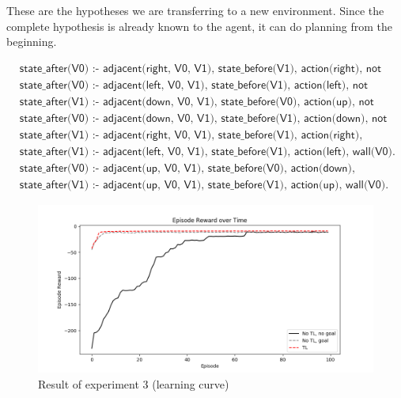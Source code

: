These are the hypotheses we are transferring to a new environment.
Since the complete hypothesis is already known to the agent, it can do planning from the beginning.

\begin{equation}
\begin{split}
 &\textsf{state\_after(V0) :- adjacent(right, V0, V1), state\_before(V1), action(right), not wall(V0).}\\
 &\textsf{state\_after(V0) :- adjacent(left, V0, V1), state\_before(V1), action(left), not wall(V0).}\\
 &\textsf{state\_after(V1) :- adjacent(down, V0, V1), state\_before(V0), action(up), not wall(V1).}\\
 &\textsf{state\_after(V0) :- adjacent(down, V0, V1), state\_before(V1), action(down), not wall(V0).}\\
 &\textsf{state\_after(V1) :- adjacent(right, V0, V1), state\_before(V1), action(right), wall(V0).}\\
 &\textsf{state\_after(V1) :- adjacent(left, V0, V1), state\_before(V1), action(left), wall(V0).}\\
 &\textsf{state\_after(V0) :- adjacent(up, V0, V1), state\_before(V0), action(down), wall(V1).}\\
 &\textsf{state\_after(V1) :- adjacent(up, V0, V1), state\_before(V1), action(up), wall(V0).}
\end{split}
\end{equation}

\begin{figure}[!htb]
\centering
\includegraphics[width=1.0\textwidth]{./figures/experiment3_after_training}
\caption{Result of experiment 3 (learning curve)}
\label{experiment3_training}
\end{figure}

